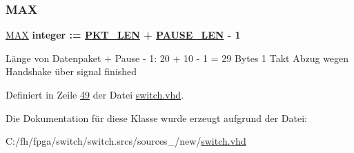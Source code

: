 \subsubsection{\texorpdfstring{M\+AX}{MAX}}
{\footnotesize\ttfamily \mbox{\hyperlink{classswitch_1_1switch_a138ff3d13d23e477480ce8fb57e9eab2}{M\+AX}} {\bfseries \textcolor{comment}{integer}\textcolor{vhdlchar}{ }\textcolor{vhdlchar}{ }\textcolor{vhdlchar}{\+:}\textcolor{vhdlchar}{=}\textcolor{vhdlchar}{ }\textcolor{vhdlchar}{ }\textcolor{vhdlchar}{ }\textcolor{vhdlchar}{ }{\bfseries \mbox{\hyperlink{classswitch_a9471bdd4db653e9a1f455d5147a685c2}{P\+K\+T\+\_\+\+L\+EN}}} \textcolor{vhdlchar}{+}\textcolor{vhdlchar}{ }\textcolor{vhdlchar}{ }\textcolor{vhdlchar}{ }{\bfseries \mbox{\hyperlink{classswitch_afc0c5f511c854ac6822209338935e527}{P\+A\+U\+S\+E\+\_\+\+L\+EN}}} \textcolor{vhdlchar}{-\/}\textcolor{vhdlchar}{ } \textcolor{vhdldigit}{1} \textcolor{vhdlchar}{ }} \hspace{0.3cm}{\ttfamily [Constant]}}

Länge von Datenpaket + Pause -\/ 1\+: 20 + 10 -\/ 1 = 29 Bytes 1 Takt Abzug wegen Handshake über signal finished 

Definiert in Zeile \mbox{\hyperlink{switch_8vhd_source_l00049}{49}} der Datei \mbox{\hyperlink{switch_8vhd_source}{switch.\+vhd}}.



Die Dokumentation für diese Klasse wurde erzeugt aufgrund der Datei\+:\begin{DoxyCompactItemize}
\item 
C\+:/fh/fpga/switch/switch.\+srcs/sources\+\_/new/\mbox{\hyperlink{switch_8vhd}{switch.\+vhd}}\end{DoxyCompactItemize}
